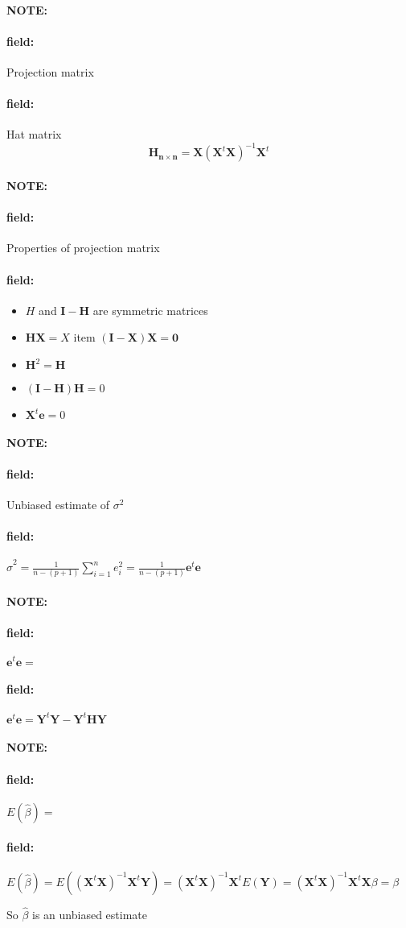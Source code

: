 \documentclass[12pt]{article}
\newenvironment{note}{\paragraph{NOTE:}}{}
\newenvironment{field}{\paragraph{field:}}{}
\begin{document}
\begin{note}
  \begin{field}
    Projection matrix
  \end{field}
  \begin{field}
    Hat matrix
    $$\mathbf{H_{n \times n}} = \mathbf{X} (\mathbf{X}^t \mathbf{X})^{-1} \mathbf{X}^t$$
  \end{field}
\end{note}


\begin{note}
  \begin{field}
    Properties of projection matrix
  \end{field}
  \begin{field}
    \begin{itemize}
      \item $H$ and $\mathbf{I} - \mathbf{H}$ are symmetric matrices
      \item $\mathbf{HX} = X$
      item $(\mathbf{I} - \mathbf{X})\mathbf{X} = \mathbf{0}$
      \item $\mathbf{H}^2 = \mathbf{H}$
      \item $(\mathbf{I} - \mathbf{H})\mathbf{H} = 0$
      \item $\mathbf{X}^t \mathbf{e} = 0$
    \end{itemize}
  \end{field}
\end{note}


\begin{note}
  \begin{field}
    Unbiased estimate of $\sigma^2$
  \end{field}
  \begin{field}
    $\hat{\sigma}^2 = \frac{1}{n- (p+1)} \sum_{i=1}^n e_i^2 = \frac{1}{n- (p+1)} \mathbf{e}^t \mathbf{e}$
  \end{field}
\end{note}



\begin{note}
  \begin{field}
    $\mathbf{e}^t \mathbf{e} = $
  \end{field}
  \begin{field}
    $\mathbf{e}^t \mathbf{e} = \mathbf{Y}^t \mathbf{Y} - \mathbf{Y}^t \mathbf{HY}$
  \end{field}
\end{note}


\begin{note}
  \begin{field}
    $E(\hat{\beta}) = $
  \end{field}
  \begin{field}
    $E(\hat{\beta}) = E((\mathbf{X}^t \mathbf{X})^{-1} \mathbf{X}^t \mathbf{Y}) = (\mathbf{X}^t \mathbf{X})^{-1} \mathbf{X}^t E(\mathbf{Y}) = (\mathbf{X}^t \mathbf{X})^{-1} \mathbf{X}^t \mathbf{X}\beta  = \beta$

    So $\hat{\beta}$ is an unbiased estimate
  \end{field}
\end{note}
\end{document}
